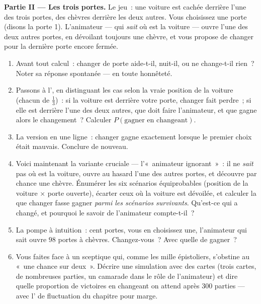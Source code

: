 \begin{problem}
\medskip
\noindent\textbf{Partie II --- Les trois portes.}
Le jeu~: une voiture est cachée derrière l'une des trois portes, des
chèvres derrière les deux autres. Vous choisissez une porte (disons
la porte 1). L'animateur --- qui \emph{sait} où est la voiture ---
ouvre l'une des deux autres portes, en dévoilant toujours une chèvre,
et vous propose de changer pour la dernière porte encore fermée.
\begin{enumerate}[resume]
  \item Avant tout calcul~: changer de porte aide-t-il, nuit-il, ou
        ne change-t-il rien~? Noter sa réponse spontanée --- en
        toute honnêteté.
  \item Passons à l', en distinguant les cas selon la vraie
        position de la voiture (chacun de  $\frac13$)~:
        si la voiture est derrière votre porte, changer fait
        perdre~; si elle est derrière l'une des deux autres, que
        doit faire l'animateur, et que gagne alors le changement~?
        Calculer $P(\text{gagner en changeant})$.
  \item La version en une ligne~: changer gagne exactement lorsque
        le premier choix était mauvais. Conclure de nouveau.
  \item Voici maintenant la variante cruciale --- l'«~animateur
        ignorant~»~: il ne \emph{sait} pas où est la voiture, ouvre
        au hasard l'une des autres portes, et découvre par chance
        une chèvre. Énumérer les six scénarios équiprobables
        (position de la voiture $\times$ porte ouverte), écarter
        ceux où la voiture est dévoilée, et calculer la 
        que changer fasse gagner \emph{parmi les scénarios
        survivants}. Qu'est-ce qui a changé, et pourquoi le savoir
        de l'animateur compte-t-il~?
  \item La pompe à intuition~: cent portes, vous en choisissez une,
        l'animateur qui sait ouvre $98$ portes à chèvres.
        Changez-vous~? Avec quelle  de gagner~?
  \item Vous faites face à un sceptique qui, comme les mille
        épistoliers, s'obstine au «~une chance sur deux~». Décrire
        une simulation avec des cartes (trois cartes, de nombreuses
        parties, un camarade dans le rôle de l'animateur) et dire
        quelle proportion de victoires en changeant on attend après
        $300$ parties --- avec l' de fluctuation du
        chapitre pour marge.
\end{enumerate}


\end{problem}

